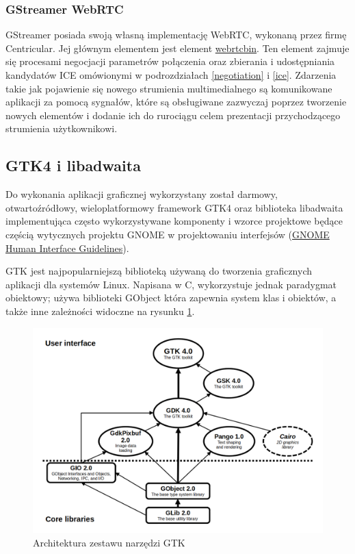 \subsubsection{GStreamer WebRTC}
\label{gstreamer_webrtc}

GStreamer posiada swoją własną implementację WebRTC, wykonaną przez firmę Centricular. Jej głównym
elementem jest element
\href{https://gstreamer.freedesktop.org/documentation/webrtc/index.html?gi-language=c}{webrtcbin}.
Ten element zajmuje się procesami negocjacji parametrów połączenia oraz zbierania i udostępniania
kandydatów ICE omówionymi w podrozdziałach \ref{negotiation} i \ref{ice}. Zdarzenia takie jak
pojawienie się nowego strumienia multimedialnego są komunikowane aplikacji za pomocą sygnałów, które
są obsługiwane zazwyczaj poprzez tworzenie nowych elementów i dodanie ich do rurociągu celem
prezentacji przychodzącego strumienia użytkownikowi.

\subsection{GTK4 i libadwaita}

Do wykonania aplikacji graficznej wykorzystany został darmowy, otwartoźródłowy, wieloplatformowy
framework GTK4 oraz biblioteka libadwaita implementująca często wykorzystywane komponenty i wzorce
projektowe będące częścią wytycznych projektu GNOME w projektowaniu interfejsów
(\href{https://developer.gnome.org/hig/}{GNOME Human Interface Guidelines}).

GTK jest najpopularniejszą biblioteką używaną do tworzenia graficznych aplikacji dla systemów Linux.
Napisana w C, wykorzystuje jednak paradygmat obiektowy; używa biblioteki GObject która zapewnia
system klas i obiektów, a także inne zależności widoczne na rysunku \ref{fig:gtk_toolkit}.

\begin{figure}[H]
    \centering
    \includegraphics[width=.7\textwidth]{img/gtk-toolkit}
    \caption{Architektura zestawu narzędzi GTK}
    \label{fig:gtk_toolkit}
\end{figure}

